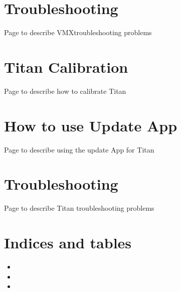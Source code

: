 \documentclass[letterpaper,10pt,english]{sphinxmanual}
\begin{document}
\chapter{Troubleshooting}
\label{\detokenize{docs/VMX/troubleshooting:troubleshooting}}\label{\detokenize{docs/VMX/troubleshooting::doc}}
Page to describe VMXtroubleshooting problems


\chapter{Titan Calibration}
\label{\detokenize{docs/Titan/calibration:titan-calibration}}\label{\detokenize{docs/Titan/calibration::doc}}
Page to describe how to calibrate Titan


\chapter{How to use Update App}
\label{\detokenize{docs/Titan/update:how-to-use-update-app}}\label{\detokenize{docs/Titan/update::doc}}
Page to describe using the update App for Titan


\chapter{Troubleshooting}
\label{\detokenize{docs/Titan/troubleshooting:troubleshooting}}\label{\detokenize{docs/Titan/troubleshooting::doc}}
Page to describe Titan troubleshooting problems


\chapter{Indices and tables}
\label{\detokenize{index:indices-and-tables}}\begin{itemize}
\item {} 

\item {} 

\item {} 

\end{itemize}



\renewcommand{\indexname}{Index}
\printindex
\end{document}
